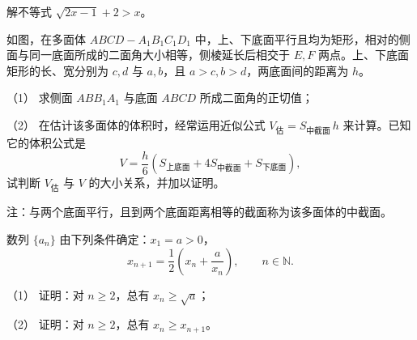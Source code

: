 \begin{question}
解不等式 \(\sqrt{2x-1}+2>x\)。

\Needspace{0.4\textheight}
\end{question}
\begin{question}
如图，在多面体 \(ABCD-A_1B_1C_1D_1\) 中，上、下底面平行且均为矩形，相对的侧面与同一底面所成的二面角大小相等，侧棱延长后相交于 \(E,F\) 两点。上、下底面矩形的长、宽分别为 \(c,d\) 与 \(a,b\)，且 \(a>c,b>d\)，两底面间的距离为 \(h\)。

（1） 求侧面 \(ABB_1A_1\) 与底面 \(ABCD\) 所成二面角的正切值；

（2） 在估计该多面体的体积时，经常运用近似公式 \(V_{\text{估}}=S_{\text{中截面}}\,h\) 来计算。已知它的体积公式是
\nopagebreak[4]
\[
V=\frac{h}{6}\left(S_{\text{上底面}}+4S_{\text{中截面}}+S_{\text{下底面}}\right),
\]
试判断 \(V_{\text{估}}\) 与 \(V\) 的大小关系，并加以证明。

注：与两个底面平行，且到两个底面距离相等的截面称为该多面体的中截面。
\nopagebreak[4]
\begin{center}\end{center}
\nopagebreak[4]
\end{question}
\begin{question}
数列 \(\{a_n\}\) 由下列条件确定：\(x_1=a>0\)，
\nopagebreak[4]
\[
x_{n+1}=\frac12\left(x_n+\frac{a}{x_n}\right),\qquad n\in\mathbb N.
\]

（1） 证明：对 \(n\geqslant2\)，总有 \(x_n\geqslant\sqrt a\)；

（2） 证明：对 \(n\geqslant2\)，总有 \(x_n\geqslant x_{n+1}\)。

\end{question}
